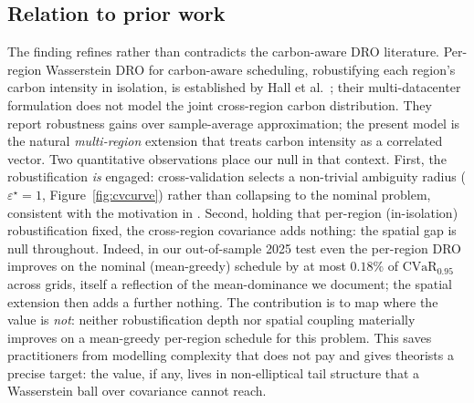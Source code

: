 \documentclass[12pt]{article}
\newcommand{\CVaR}{\mathrm{CVaR}}
\begin{document}
\subsection{Relation to prior work}
The finding refines rather than contradicts the carbon-aware DRO literature.
Per-region Wasserstein DRO for carbon-aware scheduling, robustifying each region's
carbon intensity in isolation, is established by
Hall et al.~\citep{hall2024}; their multi-datacenter formulation does not model the
joint cross-region carbon distribution. They report robustness gains over
sample-average approximation; the present model is the natural \emph{multi-region}
extension that treats carbon intensity as a correlated vector. Two quantitative
observations place our null in that context. First, the robustification \emph{is}
engaged: cross-validation selects a non-trivial ambiguity radius
($\varepsilon^\star=1$, Figure~\ref{fig:cvcurve}) rather than collapsing to the
nominal problem, consistent with the motivation in \citep{hall2024}. Second, holding
that per-region (in-isolation) robustification fixed, the cross-region covariance adds
nothing: the spatial gap is null throughout. Indeed, in our out-of-sample 2025 test
even the per-region DRO improves on the nominal (mean-greedy) schedule by at most $0.18\%$
of $\CVaR_{0.95}$ across grids, itself a reflection of the mean-dominance we
document; the spatial extension then adds a further nothing. The contribution is to
map where the value is \emph{not}: neither robustification depth nor spatial
coupling materially improves on a mean-greedy per-region schedule for this problem.
This saves practitioners from modelling complexity that does not pay and gives
theorists a precise target: the value, if any, lives in non-elliptical tail
structure that a Wasserstein ball over covariance cannot reach.
\end{document}
